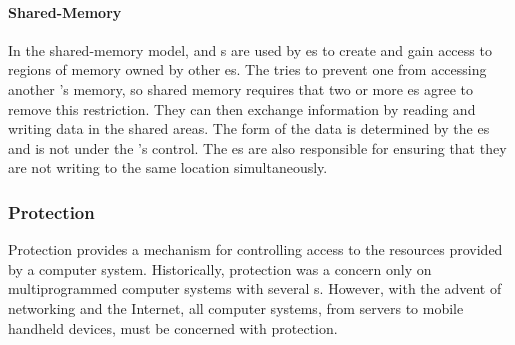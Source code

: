 \paragraph{Shared-Memory}\label{par:Shared_Memory}
In the shared-memory model,  and  s are used by es to create and gain access to regions of memory owned by other es.
The  tries to prevent one  from accessing another ’s memory, so shared memory requires that two or more es agree to remove this restriction.
They can then exchange information by reading and writing data in the shared areas.
The form of the data is determined by the es and is not under the ’s control.
The es are also responsible for ensuring that they are not writing to the same location simultaneously.

\subsubsection{Protection}\label{subsubsec:Protection}
Protection provides a mechanism for controlling access to the resources provided by a computer system.
Historically, protection was a concern only on multiprogrammed computer systems with several s.
However, with the advent of networking and the Internet, all computer systems, from servers to mobile handheld devices, must be concerned with protection.

